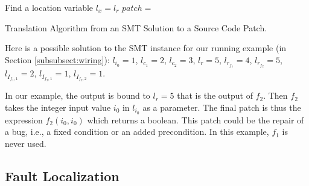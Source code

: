 \begin{algorithm}[!t]



\BlankLine  
Find a location variable $l_x = l_r$\;
$patch=$ \; 
\BlankLine
{}
\BlankLine
\caption{Translation Algorithm from an SMT Solution to a Source Code Patch.}
\label{alg:patch-pretty-print}
\end{algorithm}

Here is a possible solution to the SMT instance for our running example (in Section \ref{subsubsect:wiring}): 
\noindent 
$l_{i_0}   = 1$,              
$l_{c_1}   = 2    $,    
$l_{c_2}   = 3        $,
$l_{r}    = 5       $,
$l_{r_{f_1}}  = 4       $, 
$l_{r_{f_2}}  = 5       $, 
$l_{I_{f_1,1}}= 2  $,
$l_{I_{f_2,1}} = 1    $,
$l_{I_{f_2,2}} = 1  $.

In our example, the output is bound to $l_r=5$ that is the output of $f_2$. Then
$f_2$ takes the integer input value $i_0$ in $l_{i_0}$ as a parameter.
The final patch is thus the expression $f_2(i_0, i_0)$ which returns a boolean. This patch could be the repair of a bug, i.e., a fixed \ourif condition or an added precondition. In this example, $f_1$ is never used.

 

\subsection{Fault Localization}
\label{subsect:fault-localization}

